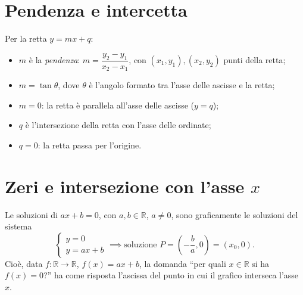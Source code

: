 \documentclass[11pt,a4paper]{article}
\theoremstyle{definition}
\begin{document}
\section{Pendenza e intercetta}

Per la retta $y = mx + q$:
\begin{itemize}
    \item $m$ è la \emph{pendenza}: $m = \dfrac{y_2 - y_1}{x_2 - x_1}$, con $(x_1, y_1), (x_2, y_2)$ punti della retta;
    \item $m = \tan\theta$, dove $\theta$ è l'angolo formato tra l'asse delle ascisse e la retta;
    \item $m = 0$: la retta è parallela all'asse delle ascisse ($y = q$);
    \item $q$ è l'intersezione della retta con l'asse delle ordinate;
    \item $q = 0$: la retta passa per l'origine.
\end{itemize}

\section{Zeri e intersezione con l'asse $x$}

Le soluzioni di $ax + b = 0$, con $a, b \in \mathbb{R}$, $a \neq 0$, sono graficamente le soluzioni del sistema
\[
\begin{cases} y = 0 \\ y = ax + b \end{cases}
\implies \text{soluzione } P = \left(-\frac{b}{a}, 0\right) = (x_0, 0).
\]
Cioè, data $f : \mathbb{R} \to \mathbb{R}$, $f(x) = ax + b$, la domanda ``per quali $x \in \mathbb{R}$ si ha $f(x) = 0$?'' ha come risposta l'ascissa del punto in cui il grafico interseca l'asse $x$.
\end{document}
